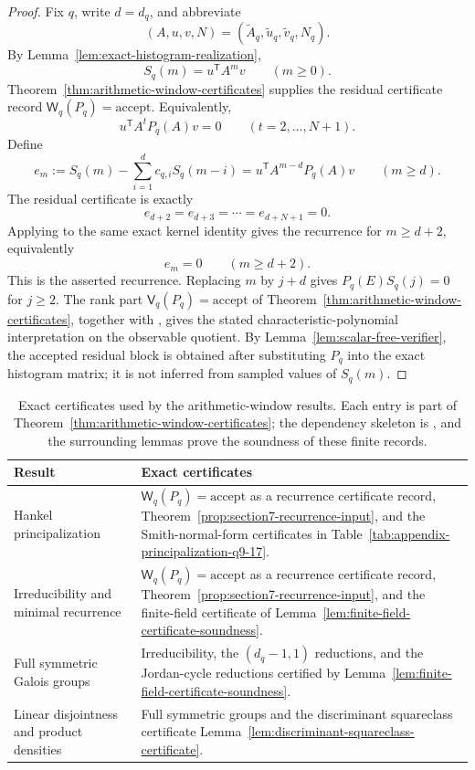 \begin{proof}
Fix \(q\), write \(d=d_q\), and abbreviate
\[
  (A,u,v,N)=(\widetilde A_q,\widetilde u_q,\widetilde v_q,N_q).
\]
By Lemma~\ref{lem:exact-histogram-realization},
\[
  S_q(m)=u^{\mathsf T}A^m v
  \qquad(m\ge0).
\]
Theorem~\ref{thm:arithmetic-window-certificates} supplies the residual certificate
record \(\mathsf W_q(P_q)=\mathrm{accept}\).  Equivalently,
\[
  u^{\mathsf T}A^tP_q(A)v=0
  \qquad(t=2,\dots,N+1).
\]
Define
\[
  e_m:=S_q(m)-\sum_{i=1}^{d}c_{q,i}S_q(m-i)
  =u^{\mathsf T}A^{m-d}P_q(A)v
  \qquad(m\ge d).
\]
The residual certificate is exactly
\[
  e_{d+2}=e_{d+3}=\cdots=e_{d+N+1}=0.
\]
Applying  to the same exact kernel
identity gives the recurrence for \(m\ge d+2\), equivalently
\[
  e_m=0
  \qquad(m\ge d+2).
\]
This is the asserted recurrence.  Replacing \(m\) by \(j+d\) gives
\(P_q(E)S_q(j)=0\) for \(j\ge2\).  The rank part
\(\mathsf V_q(P_q)=\mathrm{accept}\) of
Theorem~\ref{thm:arithmetic-window-certificates}, together with
, gives the stated
characteristic-polynomial interpretation on the observable quotient.  By
Lemma~\ref{lem:scalar-free-verifier}, the accepted residual block is obtained
after substituting \(P_q\) into the exact histogram matrix; it is not inferred
from sampled values of \(S_q(m)\).
\end{proof}

\begin{table}[t]
\centering
\small
\setlength{\tabcolsep}{4pt}
\caption{Exact certificates used by the arithmetic-window results.  Each entry is
part of Theorem~\ref{thm:arithmetic-window-certificates}; the dependency
skeleton is , and the
surrounding lemmas prove the soundness of these finite records.}
\label{tab:section7-dependency-map}
\begin{tabular}{@{}p{}p{}@{}}
\toprule
Result & Exact certificates \\
\midrule
Hankel principalization &
\(\mathsf W_q(P_q)=\mathrm{accept}\) as a recurrence certificate record,
Theorem~\ref{prop:section7-recurrence-input},
and the Smith-normal-form certificates in
Table~\ref{tab:appendix-principalization-q9-17}.\\
Irreducibility and minimal recurrence &
\(\mathsf W_q(P_q)=\mathrm{accept}\) as a recurrence certificate record,
Theorem~\ref{prop:section7-recurrence-input},
and the finite-field certificate of
Lemma~\ref{lem:finite-field-certificate-soundness}.\\
Full symmetric Galois groups &
Irreducibility, the \((d_q-1,1)\) reductions, and the Jordan-cycle reductions
certified by Lemma~\ref{lem:finite-field-certificate-soundness}.\\
Linear disjointness and product densities &
Full symmetric groups and the discriminant squareclass certificate
Lemma~\ref{lem:discriminant-squareclass-certificate}.\\
\bottomrule
\end{tabular}
\end{table}

